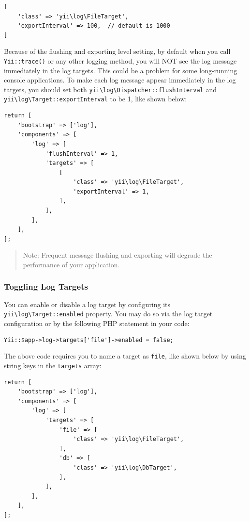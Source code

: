 \lstset{language=php}\begin{lstlisting}
[
    'class' => 'yii\log\FileTarget',
    'exportInterval' => 100,  // default is 1000
]
\end{lstlisting}
Because of the flushing and exporting level setting, by default when you call \lstinline|Yii::trace()| or any other logging
method, you will NOT see the log message immediately in the log targets. This could be a problem for some long-running
console applications. To make each log message appear immediately in the log targets, you should set both
\texttt{yii{\allowbreak{}\textbackslash}log{\allowbreak{}\textbackslash}Dispatcher\allowbreak{}::\allowbreak{}flushInterval} and \texttt{yii{\allowbreak{}\textbackslash}log{\allowbreak{}\textbackslash}Target\allowbreak{}::\allowbreak{}exportInterval} to be 1,
like shown below:

\lstset{language=php}\begin{lstlisting}
return [
    'bootstrap' => ['log'],
    'components' => [
        'log' => [
            'flushInterval' => 1,
            'targets' => [
                [
                    'class' => 'yii\log\FileTarget',
                    'exportInterval' => 1,
                ],
            ],
        ],
    ],
];
\end{lstlisting}
\begin{quote}Note: Frequent message flushing and exporting will degrade the performance of your application.

\end{quote}
\subsubsection{Toggling Log Targets \label{runtime-logging.md::toggling-log-targets}}
You can enable or disable a log target by configuring its \texttt{yii{\allowbreak{}\textbackslash}log{\allowbreak{}\textbackslash}Target\allowbreak{}::\allowbreak{}enabled} property.
You may do so via the log target configuration or by the following PHP statement in your code:

\lstset{language=php}\begin{lstlisting}
Yii::$app->log->targets['file']->enabled = false;
\end{lstlisting}
The above code requires you to name a target as \lstinline|file|, like shown below by using string keys in the
\lstinline|targets| array:

\lstset{language=php}\begin{lstlisting}
return [
    'bootstrap' => ['log'],
    'components' => [
        'log' => [
            'targets' => [
                'file' => [
                    'class' => 'yii\log\FileTarget',
                ],
                'db' => [
                    'class' => 'yii\log\DbTarget',
                ],
            ],
        ],
    ],
];
\end{lstlisting}
